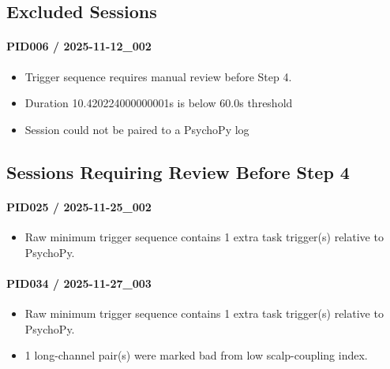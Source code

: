 \documentclass[11pt]{article}
\begin{document}
\subsection*{Excluded Sessions}
\paragraph{PID006 / 2025-11-12\_002}
\begin{itemize}
\item Trigger sequence requires manual review before Step 4.
\item Duration 10.420224000000001s is below 60.0s threshold
\item Session could not be paired to a PsychoPy log
\end{itemize}
\subsection*{Sessions Requiring Review Before Step 4}
\paragraph{PID025 / 2025-11-25\_002}
\begin{itemize}
\item Raw minimum trigger sequence contains 1 extra task trigger(s) relative to PsychoPy.
\end{itemize}
\paragraph{PID034 / 2025-11-27\_003}
\begin{itemize}
\item Raw minimum trigger sequence contains 1 extra task trigger(s) relative to PsychoPy.
\item 1 long-channel pair(s) were marked bad from low scalp-coupling index.
\end{itemize}
\end{document}
